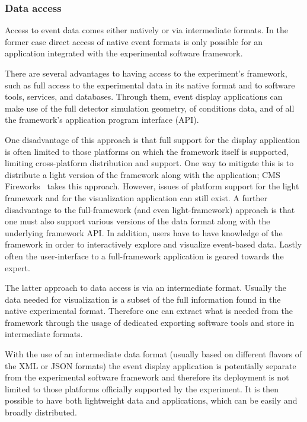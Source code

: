 \documentclass[12pt,a4paper]{article}
\begin{document}
\hypertarget{data-access}{%
\subsubsection{Data access}\label{data-access}}

Access to event data comes either natively or via intermediate formats. In the former case direct access of native event formats
is only possible for an application integrated with the experimental software framework.

There are several advantages to having access to the experiment's framework, such as full access to the experimental
data in its native format and to software tools, services, and databases. Through them, event display applications can
make use of the full detector simulation geometry, of conditions data, and of all the framework's application program interface (API).

One disadvantage of this approach is that full support for the display application is often limited to those platforms
on which the framework itself is supported, limiting cross-platform distribution and support.
One way to mitigate this is to distribute a light version of the framework along with the application; CMS Fireworks~\cite{CMSFireworks}
takes this approach. However, issues of platform support for the light framework and for the visualization application can still exist.
A further disadvantage to the full-framework (and even light-framework) approach is that one must also support various versions of
the data format along with the underlying framework API. In addition, users have to have knowledge of the framework in order to interactively
explore and visualize event-based data. Lastly often the user-interface to a
full-framework application is geared towards the expert.

The latter approach to data access is via an intermediate format. Usually the data needed for visualization is a subset of the
full information found in the native experimental format. Therefore one can extract what is needed from the framework through
the usage of dedicated exporting software tools and store in intermediate formats.

With the use of an intermediate data format (usually based on different flavors of the XML or JSON formats) the event display
application is potentially separate from the experimental software framework and therefore its deployment is not limited to
those platforms officially supported by the experiment. It is then possible to have both lightweight data and applications,
which can be easily and broadly distributed. %
\end{document}
